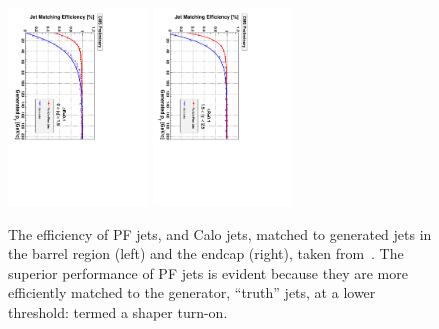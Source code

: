 \begin{figure}[htbp]
  \begin{center}
  \includegraphics[width=0.33\textwidth, angle =90]{Figures/detector/PFjetvsCalo0p1}
  \includegraphics[width=0.33\textwidth, angle =90]{Figures/detector/PFjetvsCalo0p1end}
  \caption{The efficiency of \ac{PF} jets, and Calo jets, matched to generated jets in the barrel region (left) and the endcap (right), taken from~\cite{PFT-09-001}. The superior performance of \ac{PF} jets is evident because they are more efficiently matched to the generator, ``truth'' jets, at a lower \pt threshold: termed a shaper turn-on.}
  \label{fig:PFturnOns}
  \end{center}
\end{figure}

